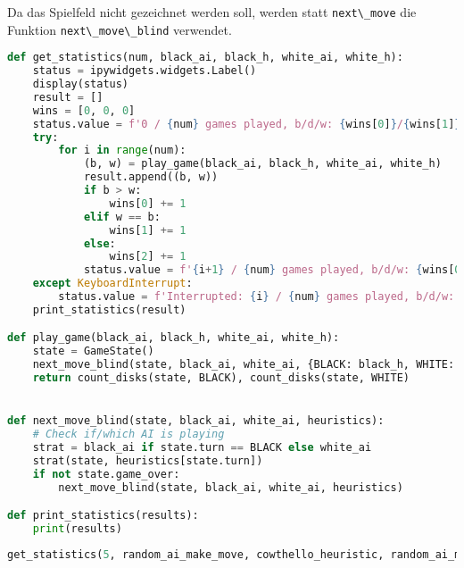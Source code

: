 Da das Spielfeld nicht gezeichnet werden soll, werden statt
\passthrough{\lstinline!next\_move!} die Funktion
\passthrough{\lstinline!next\_move\_blind!} verwendet.

\begin{lstlisting}[language=Python]
def get_statistics(num, black_ai, black_h, white_ai, white_h):
    status = ipywidgets.widgets.Label()
    display(status)
    result = []
    wins = [0, 0, 0]
    status.value = f'0 / {num} games played, b/d/w: {wins[0]}/{wins[1]}/{wins[2]}'
    try:
        for i in range(num):
            (b, w) = play_game(black_ai, black_h, white_ai, white_h)
            result.append((b, w))
            if b > w:
                wins[0] += 1
            elif w == b:
                wins[1] += 1
            else:
                wins[2] += 1
            status.value = f'{i+1} / {num} games played, b/d/w: {wins[0]}/{wins[1]}/{wins[2]}'
    except KeyboardInterrupt:
        status.value = f'Interrupted: {i} / {num} games played, b/d/w: {wins[0]}/{wins[1]}/{wins[2]}'
    print_statistics(result)

def play_game(black_ai, black_h, white_ai, white_h):
    state = GameState()
    next_move_blind(state, black_ai, white_ai, {BLACK: black_h, WHITE: white_h})
    return count_disks(state, BLACK), count_disks(state, WHITE)


def next_move_blind(state, black_ai, white_ai, heuristics):
    # Check if/which AI is playing
    strat = black_ai if state.turn == BLACK else white_ai
    strat(state, heuristics[state.turn])
    if not state.game_over:
        next_move_blind(state, black_ai, white_ai, heuristics)

def print_statistics(results):
    print(results)
\end{lstlisting}

\begin{lstlisting}[language=Python]
get_statistics(5, random_ai_make_move, cowthello_heuristic, random_ai_make_move, cowthello_heuristic)
\end{lstlisting}
